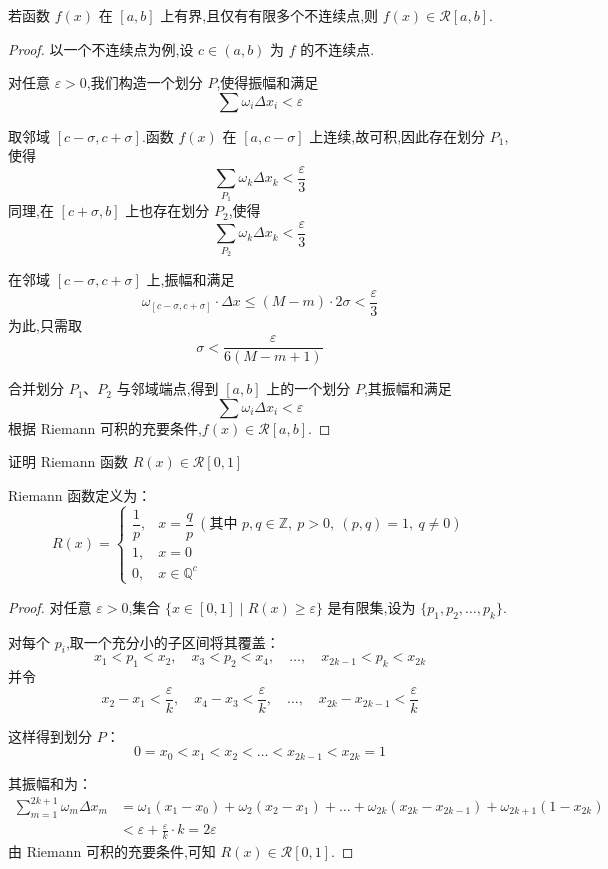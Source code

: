 \begin{proposition}
	
	若函数 $f(x)$ 在 $[a,b]$ 上有界,且仅有有限多个不连续点,则 $f(x) \in \mathcal{R}[a,b]$.
	
\end{proposition}
\begin{proof}
	
	以一个不连续点为例,设 $c \in (a,b)$ 为 $f$ 的不连续点.
	
	对任意 $\varepsilon>0$,我们构造一个划分 $P$,使得振幅和满足
	\[
	\sum \omega_i \Delta x_i < \varepsilon
	\]
	
	
	取邻域 $[c-\sigma, c+\sigma]$.函数 $f(x)$ 在 $[a, c-\sigma]$ 上连续,故可积,因此存在划分 $P_1$,使得
	\[
	\sum_{P_1} \omega_k \Delta x_k < \frac{\varepsilon}{3}
	\]
	同理,在 $[c+\sigma, b]$ 上也存在划分 $P_2$,使得
	\[
	\sum_{P_2} \omega_k \Delta x_k < \frac{\varepsilon}{3}
	\]
	
	在邻域 $[c-\sigma, c+\sigma]$ 上,振幅和满足
	\[
	\omega_{[c-\sigma, c+\sigma]} \cdot \Delta x \leq (M-m) \cdot 2\sigma < \frac{\varepsilon}{3}
	\]
	为此,只需取
	\[
	\sigma < \frac{\varepsilon}{6(M-m+1)}
	\]
	
	合并划分 $P_1$、$P_2$ 与邻域端点,得到 $[a,b]$ 上的一个划分 $P$,其振幅和满足
	\[
	\sum \omega_i \Delta x_i < \varepsilon
	\]
	根据 Riemann 可积的充要条件,$f(x) \in \mathcal{R}[a,b]$.
\end{proof}
\begin{example}
	证明 Riemann 函数 \( R(x) \in \mathcal{R}[0,1] \)
	
	Riemann 函数定义为：
	\[
	R(x)=
	\begin{cases}
		\dfrac{1}{p}, & x=\dfrac{q}{p}\ (\text{其中 } p,q\in\mathbb{Z},\ p>0,\ (p,q)=1,\ q\neq0) \\[4pt]
		1, & x=0 \\[4pt]
		0, & x\in\mathbb{Q}^c
	\end{cases}
	\]
\end{example}
\begin{proof}
	对任意 \( \varepsilon>0 \),集合 \( \{x\in[0,1]\mid R(x)\ge\varepsilon\} \) 是有限集,设为 \( \{p_1,p_2,\dots,p_k\} \).
	
	对每个 \( p_i \),取一个充分小的子区间将其覆盖：
	\[
	x_1 < p_1 < x_2,\quad x_3 < p_2 < x_4,\quad \dots,\quad x_{2k-1} < p_k < x_{2k}
	\]
	并令
	\[
	x_2-x_1 < \frac{\varepsilon}{k},\quad x_4-x_3 < \frac{\varepsilon}{k},\quad \dots,\quad x_{2k}-x_{2k-1} < \frac{\varepsilon}{k}
	\]
	
	这样得到划分 \( P \)：
	\[
	0 = x_0 < x_1 < x_2 < \dots < x_{2k-1} < x_{2k} = 1
	\]
	
	其振幅和为：
	\[
	\begin{aligned}
		\sum_{m=1}^{2k+1} \omega_m \Delta x_m
		&= \omega_1(x_1-x_0) + \omega_2(x_2-x_1) + \dots + \omega_{2k}(x_{2k}-x_{2k-1}) + \omega_{2k+1}(1-x_{2k}) \\
		&< \varepsilon + \frac{\varepsilon}{k} \cdot k = 2\varepsilon
	\end{aligned}
	\]
	由 Riemann 可积的充要条件,可知 \( R(x) \in \mathcal{R}[0,1] \).
\end{proof}
